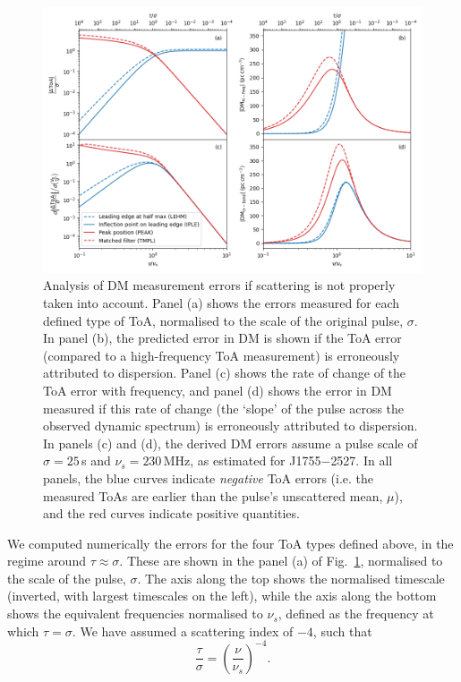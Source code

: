 \documentclass[fleqn,usenatbib]{mnras}
\newcommand{\src}{J1755$-$2527}
\newcommand{\Fig}{Fig.}
\begin{document}
\begin{figure}
    \centering
    \includegraphics[width=0.98\linewidth]{scattering_DM.png}
    \caption{Analysis of DM measurement errors if scattering is not properly taken into account. Panel (a) shows the errors measured for each defined type of ToA, normalised to the scale of the original pulse, $\sigma$. In panel (b), the predicted error in DM is shown if the ToA error (compared to a high-frequency ToA measurement) is erroneously attributed to dispersion. Panel (c) shows the rate of change of the ToA error with frequency, and panel (d) shows the error in DM measured if this rate of change (the `slope' of the pulse across the observed dynamic spectrum) is erroneously attributed to dispersion. In panels (c) and (d), the derived DM errors assume a pulse scale of $\sigma = 25\,$s and $\nu_s = 230\,$MHz, as estimated for \src{}. In all panels, the blue curves indicate \emph{negative} ToA errors (i.e. the measured ToAs are earlier than the pulse's unscattered mean, $\mu$), and the red curves indicate positive quantities.}
    \label{fig:scattering_DM}
\end{figure}

We computed numerically \citep[using SciPy's \texttt{root} function;][]{2020NatMe..17..261V} the errors for the four ToA types defined above, in the regime around $\tau \approx \sigma$.
These are shown in the panel (a) of \Fig~\ref{fig:scattering_DM}, normalised to the scale of the pulse, $\sigma$.
The axis along the top shows the normalised timescale (inverted, with largest timescales on the left), while the axis along the bottom shows the equivalent frequencies normalised to $\nu_s$, defined as the frequency at which $\tau = \sigma$.
We have assumed a scattering index of $-4$, such that
\begin{equation}
    \frac{\tau}{\sigma} = \left(\frac{\nu}{\nu_s}\right)^{-4}.
\end{equation}
\end{document}
